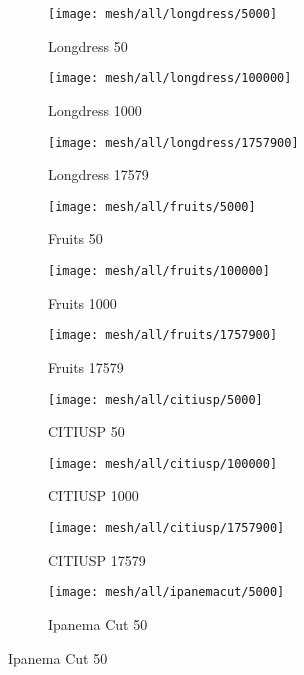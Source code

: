 \begin{figure}
    \centering
    \begin{subfigure}{0.3\textwidth}
        \centering
        \texttt{[image: mesh/all/longdress/5000]}
        \caption{Longdress 50}
    \end{subfigure}
    \begin{subfigure}{0.3\textwidth}
        \centering
        \texttt{[image: mesh/all/longdress/100000]}
        \caption{Longdress 1000}
    \end{subfigure}
    \begin{subfigure}{0.3\textwidth}
        \centering
        \texttt{[image: mesh/all/longdress/1757900]}
        \caption{Longdress 17579}
    \end{subfigure}
    \begin{subfigure}{0.3\textwidth}
        \centering
        \texttt{[image: mesh/all/fruits/5000]}
        \caption{Fruits 50}
    \end{subfigure}
    \begin{subfigure}{0.3\textwidth}
        \centering
        \texttt{[image: mesh/all/fruits/100000]}
        \caption{Fruits 1000}
    \end{subfigure}
    \begin{subfigure}{0.3\textwidth}
        \centering
        \texttt{[image: mesh/all/fruits/1757900]}
        \caption{Fruits 17579}
    \end{subfigure}
    \begin{subfigure}{0.3\textwidth}
        \centering
        \texttt{[image: mesh/all/citiusp/5000]}
        \caption{CITIUSP 50}
    \end{subfigure}
    \begin{subfigure}{0.3\textwidth}
        \centering
        \texttt{[image: mesh/all/citiusp/100000]}
        \caption{CITIUSP 1000}
    \end{subfigure}
    \begin{subfigure}{0.3\textwidth}
        \centering
        \texttt{[image: mesh/all/citiusp/1757900]}
        \caption{CITIUSP 17579}
    \end{subfigure}
    \begin{subfigure}{0.3\textwidth}
        \centering
        \texttt{[image: mesh/all/ipanemacut/5000]}
        \caption{Ipanema Cut 50}
    \end{subfigure}

\end{figure}
